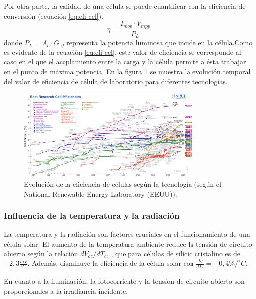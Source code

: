 Por otra parte, la calidad de una célula se puede cuantificar con la eficiencia de conversión (ecuación \ref{eq:efi-cel}).
\begin{equation}
\eta =\frac{I_{mpp}\cdot V_{mpp}}{P_L}
\label{eq:efi-cel}
\end{equation}
donde \(P_L=A_c\cdot G_{ef}\) representa la potencia luminosa que incide en la célula.Como es evidente de la ecuación \ref{eq:efi-cel}, este valor de eficiencia se corresponde al caso en el que el acoplamiento entre la carga y la célula permite a ésta trabajar en el punto de máxima potencia. En la figura \ref{fig:org5635b2b} se muestra la evolución temporal del valor de eficiencia de célula de laboratorio para diferentes tecnologías.

\begin{figure}[htbp]
\centering
\includegraphics[keepaspectratio,width=0.8\textwidth,height=0.5\textheight]{figuras/cell-efficiencies.pdf}
\caption{\label{fig:org5635b2b}Evolución de la eficiencia de células según la tecnología (según el National Renewable Energy Laboratory \cite{nrel24} (EEUU)).}
\end{figure}

\subsubsection{Influencia de la temperatura y la radiación}
\label{sec:org1824d9a}
La temperatura y la radiación son factores cruciales en el funcionamiento de una célula solar. El aumento de la temperatura ambiente reduce la tensión de circuito abierto según la relación \(dV_{oc}/dT_c\), , que para células de silicio cristalino es de\(-2,3\frac{mV}{^\circ C}\). Además, disminuye la eficiencia de la célula solar con \(\frac{d\eta}{dT_c}=-0,4\%/^\circ C\).

En cuanto a la iluminación, la fotocorriente y la tensíon de circuito abierto son proporcionales a la irradiancia incidente.

